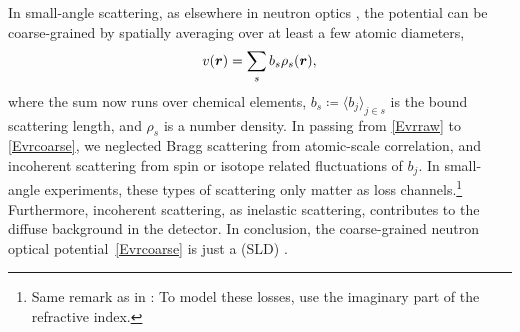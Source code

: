 In small-angle scattering,
%
%
%
as elsewhere in neutron optics \cite{Sea89},
%
%
the potential can be coarse-grained by spatially averaging over at least a few atomic diameters,
\begin{equation}\label{Evrcoarse}
  v(\bm{r})
  = \sum_s b_s \rho_s(\bm{r}),
\end{equation}
%
where the sum now runs over chemical elements,
$b_s\coloneqq\langle b_j\rangle_{j\in s}$ is the bound  scattering length,
%
%
and $\rho_s$ is a number density.
%
%
%
In passing from \cref{Evrraw} to \cref{Evrcoarse},
we neglected Bragg scattering
%
%
from atomic-scale correlation,
%
%
and incoherent scattering from spin or isotope related fluctuations of $b_j$.
%
%
%
%
%
In small-angle experiments,
 these types of scattering only matter as loss channels.\footnote
{Same remark as in : To model these losses, use the
%
%
imaginary part of the refractive index.}
Furthermore, incoherent scattering, as inelastic scattering,
 contributes to the diffuse background in the detector.
%
%
%
%
%
In conclusion, the coarse-grained neutron optical potential~\cref{Evrcoarse}
%
%
%
is just a  (SLD)
%
%
\cite[eq.\ 2.8.37]{Sea89}.

